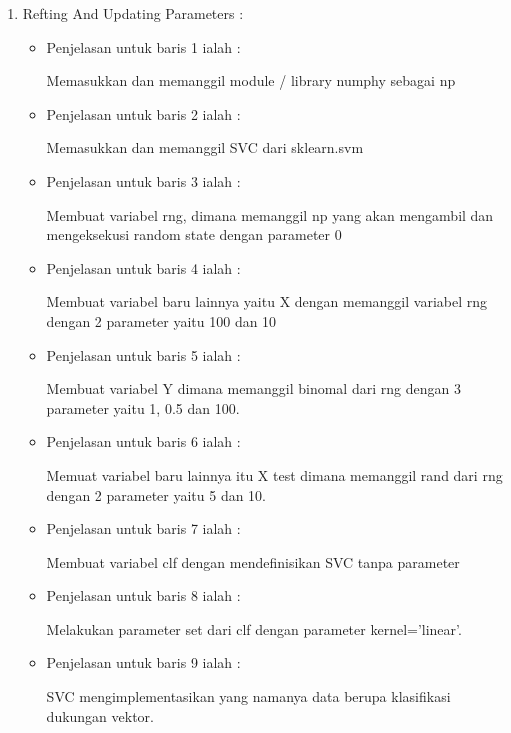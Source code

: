 \begin{enumerate}
\begin{itemize}
\begin{enumerate}
\par
\par
\par
\par
\par
\item Refting And Updating Parameters :
\par
\begin{itemize}
\item Penjelasan untuk baris 1 ialah : 
\par Memasukkan dan memanggil module / library numphy sebagai np
\par
\par
\item Penjelasan untuk baris 2 ialah :
\par Memasukkan dan memanggil SVC dari sklearn.svm
\par
\item Penjelasan untuk baris 3  ialah :
\par Membuat variabel rng, dimana memanggil np yang akan mengambil dan mengeksekusi random state dengan parameter 0
\par
\item Penjelasan untuk baris 4  ialah :
\par Membuat variabel baru lainnya yaitu X dengan memanggil variabel rng dengan 2 parameter yaitu 100 dan 10
\par
\item Penjelasan untuk baris 5  ialah :
\par Membuat variabel Y dimana memanggil binomal dari rng dengan 3 parameter yaitu 1, 0.5 dan 100.
\par
\item Penjelasan untuk baris 6 ialah :
\par Memuat variabel baru lainnya itu X test dimana memanggil rand dari rng dengan 2 parameter yaitu 5 dan 10.
\par
\item Penjelasan untuk baris 7 ialah : 
\par Membuat variabel clf dengan mendefinisikan SVC tanpa parameter
\par
\par
\item Penjelasan untuk baris 8 ialah :
\par Melakukan parameter set dari clf dengan parameter kernel='linear'.
\par
\item Penjelasan untuk baris 9 ialah :
\par SVC mengimplementasikan yang namanya data berupa klasifikasi dukungan vektor.

\end{itemize}
\end{enumerate}
\end{itemize}
\end{enumerate}
